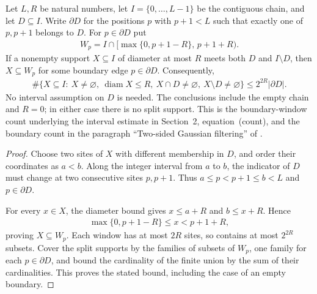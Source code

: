 \begin{lemma}
    \label{lem:chain_boundary_crossing_count}
    \leanok
    Let $L,R$ be natural numbers, let $I=\{0,\ldots,L-1\}$ be the
    contiguous chain, and let $D\subseteq I$. Write $\partial D$ for the
    positions $p$ with $p+1<L$ such that exactly one of $p,p+1$ belongs
    to $D$. For $p\in\partial D$ put
    \begin{align}
        W_p=I\cap[\max\{0,p+1-R\},\,p+1+R).
    \end{align}
    If a nonempty support $X\subseteq I$ of diameter at most $R$ meets
    both $D$ and $I\setminus D$, then $X\subseteq W_p$ for some boundary
    edge $p\in\partial D$. Consequently,
    \begin{align}
        \#\{X\subseteq I:\ X\ne\varnothing,\ \operatorname{diam}X\le R,
        \ X\cap D\ne\varnothing,\ X\setminus D\ne\varnothing\}
        \le 2^{2R}|\partial D|.
    \end{align}
    No interval assumption on $D$ is needed. The conclusions include the
    empty chain and $R=0$; in either case there is no split support.
    This is the boundary-window count underlying the interval estimate
    in Section~2, equation~\textup{(count)}, and the boundary count in the
    paragraph ``Two-sided Gaussian filtering'' of
    \cite{TNLean2026OneDimensional}.
\end{lemma}
\begin{proof}
    \leanok
    Choose two sites of $X$ with different membership in $D$, and order
    their coordinates as $a<b$. Along the integer interval from $a$ to
    $b$, the indicator of $D$ must change at two consecutive sites
    $p,p+1$. Thus $a\le p<p+1\le b<L$ and $p\in\partial D$.

    For every $x\in X$, the diameter bound gives
    $x\le a+R$ and $b\le x+R$. Hence
    \begin{align}
        \max\{0,p+1-R\}\le x<p+1+R,
    \end{align}
    proving $X\subseteq W_p$. Each window has at most $2R$ sites, so
    contains at most $2^{2R}$ subsets. Cover the split supports by the
    families of subsets of $W_p$, one family for each $p\in\partial D$,
    and bound the cardinality of the finite union by the sum of their
    cardinalities. This proves the stated bound, including the case of
    an empty boundary.
\end{proof}

